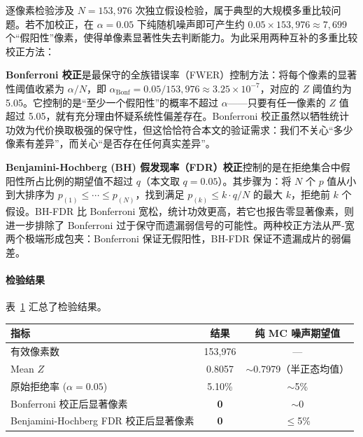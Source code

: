 逐像素检验涉及 $N = 153{,}976$ 次独立假设检验，属于典型的大规模多重比较问题。若不加校正，在 $\alpha = 0.05$ 下纯随机噪声即可产生约 $0.05 \times 153{,}976 \approx 7{,}699$ 个``假阳性''像素，使得单像素显著性失去判断能力。为此采用两种互补的多重比较校正方法：

\textbf{Bonferroni 校正}是最保守的全族错误率（FWER）控制方法：将每个像素的显著性阈值收紧为 $\alpha/N$，即 $\alpha_{\mathrm{Bonf}} = 0.05/153{,}976 \approx 3.25 \times 10^{-7}$，对应的 $Z$ 阈值约为 5.05。它控制的是``至少一个假阳性''的概率不超过 $\alpha$——只要有任一像素的 $Z$ 值超过 5.05，就有充分理由怀疑系统性偏差存在。Bonferroni 校正虽然以牺牲统计功效为代价换取极强的保守性，但这恰恰符合本文的验证需求：我们不关心``多少像素有差异''，而关心``是否存在任何真实差异''。

\textbf{Benjamini-Hochberg (BH) 假发现率（FDR）校正}控制的是在拒绝集合中假阳性所占比例的期望值不超过 $q$（本文取 $q = 0.05$）。其步骤为：将 $N$ 个 $p$ 值从小到大排序为 $p_{(1)} \leq \cdots \leq p_{(N)}$，找到满足 $p_{(k)} \leq k \cdot q / N$ 的最大 $k$，拒绝前 $k$ 个假设。BH-FDR 比 Bonferroni 宽松，统计功效更高，若它也报告零显著像素，则进一步排除了 Bonferroni 过于保守而遗漏弱信号的可能性。两种校正方法从严-宽两个极端形成包夹：Bonferroni 保证无假阳性，BH-FDR 保证不遗漏成片的弱偏差。

\paragraph{检验结果}

表~\ref{tab:pixel-consistency} 汇总了检验结果。

\begin{table}[htbp]
  \centering
  \label{tab:pixel-consistency}
  \small
  \begin{tabular}{lcc}
    \toprule
    指标 & 结果 & 纯 MC 噪声期望值 \\
    \midrule
    有效像素数                          & 153{,}976               & — \\
    Mean $Z$                            & 0.8057                  & $\sim$0.7979（半正态均值）\\
    原始拒绝率 ($\alpha = 0.05$)        & 5.10\%                  & $\sim$5\% \\
    Bonferroni 校正后显著像素           & \textbf{0}              & $\sim$0 \\
    Benjamini-Hochberg FDR 校正后显著像素 & \textbf{0}            & $\leq$5\% \\
    \bottomrule
  \end{tabular}
\end{table}

